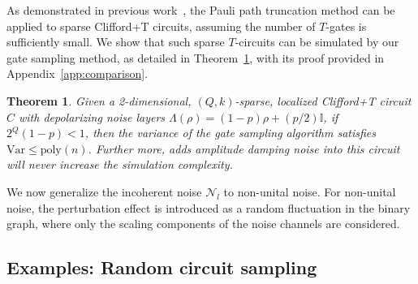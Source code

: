 \documentclass[aps,%
twocolumn,%
floatfix,%
pra,%
amsfonts,%
longbibliography,%
groupedaddress,%
superscriptaddress]{revtex4-2}%
\newtheorem{theorem}{Theorem}
\newtheorem{lemma}{Lemma}
\newcommand{\1}{\mathbbm{1}}
\begin{document}
As demonstrated in previous work~\cite{gonzalez2024pauli}, the Pauli path truncation method can be applied to sparse Clifford+T circuits, assuming the number of \( T \)-gates is sufficiently small. We show that such sparse \( T \)-circuits can be simulated by our gate sampling method, as detailed in Theorem~\ref{theo:sparse_CT}, with its proof provided in Appendix~\ref{app:comparison}.
\begin{theorem}\label{theo:sparse_CT}
    Given a 2-dimensional, \( (Q, k) \)-sparse, localized Clifford+T circuit \( C \) with depolarizing noise layers \( \Lambda(\rho) = (1 - p)\rho +({p}/{2}) \mathbb{I} \), if $2^Q(1 - p)  < 1$, then the variance of the gate sampling algorithm satisfies \( \text{Var} \leq \text{poly}(n) \). Further more, adds amplitude damping noise into this circuit will never increase the simulation complexity. 
\end{theorem}

     

We now generalize the incoherent noise \( \mathcal{N}_l \) to non-unital noise. For non-unital noise, the perturbation effect is introduced as a random fluctuation in the binary graph, where only the scaling components of the noise channels are considered.


\subsection{Examples: Random circuit sampling}
\end{document}
